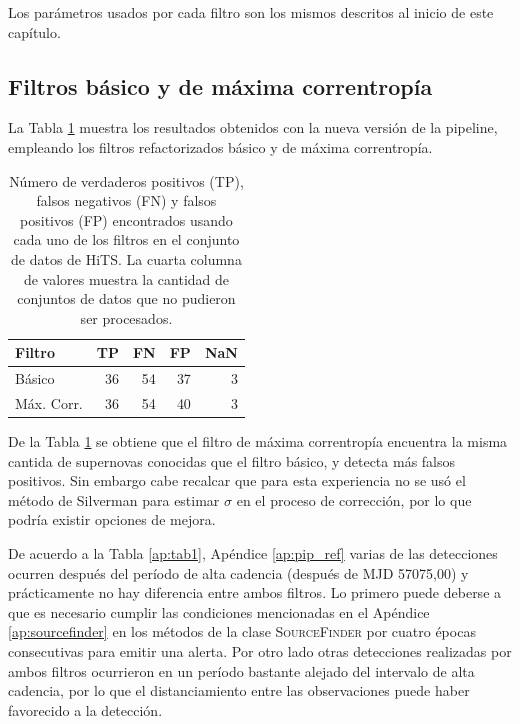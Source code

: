 Los par\'ametros usados por cada filtro son los mismos descritos al inicio de este cap\'itulo.

\subsection{Filtros b\'asico y de m\'axima correntrop\'ia}
La Tabla \ref{tab:tpfn_new} muestra los resultados obtenidos con la nueva versi\'on de la pipeline, empleando los filtros refactorizados b\'asico y de m\'axima correntrop\'ia.
\bigskip

\begin{table}[h!]
\centering
\caption{N\'umero de verdaderos positivos (TP), falsos negativos (FN) y falsos positivos (FP) encontrados usando cada uno de los filtros en el conjunto de datos de HiTS. La cuarta columna de valores muestra la cantidad de conjuntos de datos que no pudieron ser procesados.}
\begin{tabular}{|l|r|r|r|r|}
\hline
\textbf{Filtro} & \textbf{TP} & \textbf{FN} & \textbf{FP} & \textbf{NaN}\\ \hline
Básico          & 36          & 54          & 37 &  3 \\ \hline
M\'ax. Corr.             & 36          & 54          & 40  & 3 \\ \hline
\end{tabular}
\label{tab:tpfn_new}
\end{table}
\bigskip

De la Tabla \ref{tab:tpfn_new} se obtiene que el filtro de m\'axima correntrop\'ia encuentra la misma cantida de supernovas conocidas que el filtro b\'asico, y detecta m\'as falsos positivos. Sin embargo cabe recalcar que para esta experiencia no se us\'o el m\'etodo de Silverman para estimar $\sigma$ en el proceso de correcci\'on, por lo que podr\'ia existir opciones de mejora.
\bigskip

De acuerdo a la Tabla \ref{ap:tab1}, Ap\'endice \ref{ap:pip_ref} varias de las detecciones ocurren despu\'es  del per\'iodo de alta cadencia (despu\'es de MJD 57075,00) y pr\'acticamente no hay diferencia entre ambos filtros. Lo primero puede deberse a que es necesario cumplir las condiciones mencionadas en el Ap\'endice \ref{ap:sourcefinder} en los m\'etodos de la clase \textsc{SourceFinder} por cuatro \'epocas consecutivas para emitir una alerta. Por otro lado otras detecciones realizadas por ambos filtros ocurrieron en un per\'iodo bastante alejado del intervalo de alta cadencia, por lo que el distanciamiento entre las observaciones puede haber favorecido a la detecci\'on.
\bigskip
  

